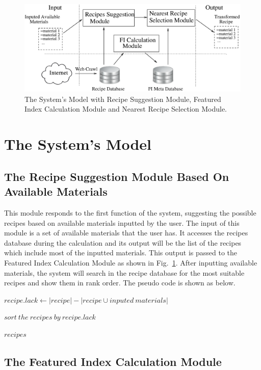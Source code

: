 \begin{figure}[ht]
\centering
\includegraphics[scale=0.8]{system.eps} 
\caption{The System's Model with Recipe Suggestion Module, Featured Index Calculation Module and Nearest Recipe Selection Module.}
\label{fig:system-model}
\end{figure}

\section{The System's Model}

\subsection{The Recipe Suggestion Module Based On Available Materials}

This module responds to the first function of the system, suggesting the possible recipes based on available materials inputted by the user. The input of this module is a set of available materials that the user has. It accesses the recipes database during the calculation and its output will be the list of the recipes which include most of the inputted materials. This output is passed to the Featured Index Calculation Module as shown in Fig.~\ref{fig:system-model}. After inputting available materials, the system will search in the recipe database for the most suitable recipes and show them in rank order. The pseudo code is shown as below. 

\begin{algorithmic}

\State $recipe.lack \gets |recipe| - |recipe \cup inputed\ materials|$
\EndFor

\State $sort\ the\ recipes\ by\ recipe.lack$

\Return $recipes$

\end{algorithmic}


\subsection{The Featured Index Calculation Module}

